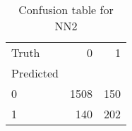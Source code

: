 \begin{table}[h!]
\caption{Confusion table for NN2}
\label{tab:NN2}
\begin{tabular}{lrr}
\toprule
Truth & 0 & 1 \\
Predicted &  &  \\
\midrule
0 & 1508 & 150 \\
1 & 140 & 202 \\
\bottomrule
\end{tabular}
\end{table}
